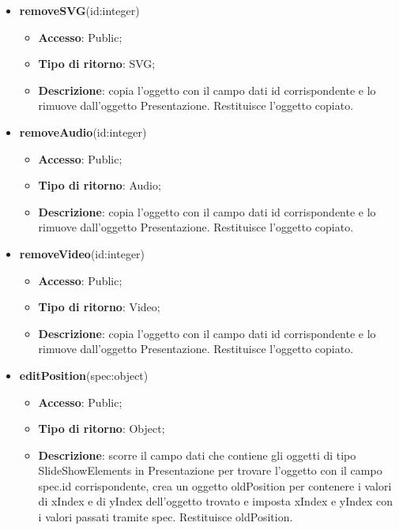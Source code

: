 {\begin{itemize}
\begin{itemize}
				\item \textbf{Accesso}: Public;
				\item \textbf{Tipo di ritorno}: Image;
				\item \textbf{Descrizione}: copia l’oggetto con il campo dati id corrispondente e lo rimuove dall’oggetto Presentazione. Restituisce l’oggetto copiato.
			\end{itemize}
			\item \textbf{removeSVG}(id:integer)
			\begin{itemize}
				\item \textbf{Accesso}: Public;
				\item \textbf{Tipo di ritorno}: SVG;
				\item \textbf{Descrizione}: copia l’oggetto con il campo dati id corrispondente e lo rimuove dall’oggetto Presentazione. Restituisce l’oggetto copiato.
			\end{itemize}
			\item \textbf{removeAudio}(id:integer)
			\begin{itemize}
				\item \textbf{Accesso}: Public;
				\item \textbf{Tipo di ritorno}: Audio;
				\item \textbf{Descrizione}: copia l’oggetto con il campo dati id corrispondente e lo rimuove dall’oggetto Presentazione. Restituisce l’oggetto copiato.
			\end{itemize}
			\item \textbf{removeVideo}(id:integer)
			\begin{itemize}
				\item \textbf{Accesso}: Public;
				\item \textbf{Tipo di ritorno}: Video;
				\item \textbf{Descrizione}: copia l’oggetto con il campo dati id corrispondente e lo rimuove dall’oggetto Presentazione. Restituisce l’oggetto copiato.
			\end{itemize}
			\item \textbf{editPosition}(spec:object)
			\begin{itemize}
				\item \textbf{Accesso}: Public;
				\item \textbf{Tipo di ritorno}: Object;
				\item \textbf{Descrizione}: scorre il campo dati che contiene gli oggetti di tipo SlideShowElements in Presentazione per trovare l’oggetto con il campo spec.id corrispondente, crea un oggetto oldPosition per contenere i valori di xIndex e di yIndex dell’oggetto trovato e imposta xIndex e yIndex con i valori passati tramite spec. Restituisce oldPosition.

\end{itemize}
\end{itemize}}
